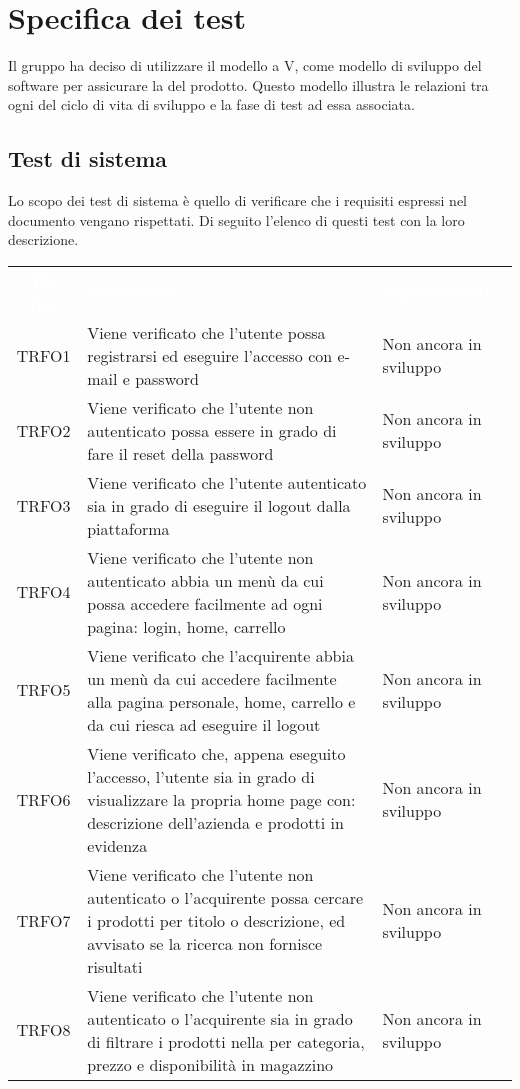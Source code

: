 \section{Specifica dei test}
\label{specificatest}
Il gruppo ha deciso di utilizzare il modello a V, come modello di sviluppo del software per assicurare la  del prodotto. Questo modello illustra le relazioni tra ogni  del ciclo di vita di sviluppo e la fase di test ad essa associata.
\subsection{Test di sistema}
Lo scopo dei test di sistema è quello di verificare che i requisiti espressi nel documento \AdR{} vengano rispettati. Di seguito l'elenco di questi test con la loro descrizione.
\begin{longtable}{|c| C{10cm} |C{3cm}|}
	\textcolor{white}{\textbf{ID Test}}&
	\textcolor{white}{\textbf{Descrizione}}&
	\textcolor{white}{\textbf{Implementato}}\label{tab:TestSistema1}\\
	TRFO1 & Viene verificato che l'utente possa registrarsi ed eseguire l'accesso con e-mail e password & Non ancora in sviluppo\\ \hline
	TRFO2 & Viene verificato che l'utente non autenticato possa essere in grado di fare il reset della password & Non ancora in sviluppo\\ \hline
	TRFO3 & Viene verificato che l'utente autenticato sia in grado di eseguire il logout dalla piattaforma & Non ancora in sviluppo\\ \hline
	TRFO4 & Viene verificato che l'utente non autenticato abbia un menù da cui possa accedere facilmente ad ogni pagina: login, home, carrello & Non ancora in sviluppo\\ \hline
	TRFO5 & Viene verificato che l'acquirente abbia un menù da cui accedere facilmente alla pagina personale, home, carrello e da cui riesca ad eseguire il logout & Non ancora in sviluppo\\ \hline
	TRFO6 & Viene verificato che, appena eseguito l'accesso, l'utente sia in grado di visualizzare la propria home page con: descrizione dell'azienda e prodotti in evidenza & Non ancora in sviluppo\\ \hline
	TRFO7 & Viene verificato che l'utente non autenticato o l'acquirente possa cercare i prodotti per titolo o descrizione, ed avvisato se la ricerca non fornisce risultati & Non ancora in sviluppo\\ \hline
	TRFO8 & Viene verificato che l'utente non autenticato o l'acquirente sia in grado di filtrare i prodotti nella  per categoria, prezzo e disponibilità in magazzino & Non ancora in sviluppo\\ \hline

\end{longtable}
